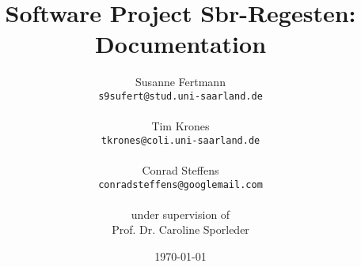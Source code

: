 \documentclass[11pt]{article}
\begin{document}
\title{Software Project Sbr-Regesten: Documentation}
\author{Susanne Fertmann\\
  \texttt{s9sufert@stud.uni-saarland.de}\\
  \\
  Tim Krones\\
  \texttt{tkrones@coli.uni-saarland.de}\\
  \\
  Conrad Steffens\\
  \texttt{conradsteffens@googlemail.com}\\
\\
under supervision of\\
Prof. Dr. Caroline Sporleder}
\date{\today}

\maketitle
\tableofcontents
\newpage


\newpage

\newpage

\newpage

\newpage

\newpage

\newpage

\appendix

\newpage

\newpage

\end{document}
